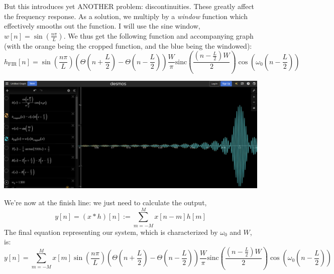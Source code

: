 \documentclass[a4paper]{article}
\begin{document}
But this introduces yet ANOTHER problem: discontinuities. These greatly affect the frequency response. As a solution, we multiply by a \textit{window} function which effectively smooths out the function. I will use the sine window, $w[n] = \sin(\frac{n\pi}{L})$. We thus get the following function and accompanying graph (with the orange being the cropped function, and the blue being the windowed):
$$h_\text{FIR}[n] = \sin(\frac{n\pi}{L})(\Theta(n + \frac{L}{2}) - \Theta(n - \frac{L}{2})) \frac{W}{\pi} \text{sinc}(\frac{(n-\frac{L}{2})W}{2})\cos(\omega_0 (n-\frac{L}{2}))$$
\begin{center}
\includegraphics[scale=0.3]{windowed_sinc.png} 
\end{center}
We're now at the finish line: we just need to calculate the output,
$$y[n] = (x * h)[n] := \sum_{m = -M}^M x[n-m]h[m]$$
The final equation representing our system, which is characterized by $\omega_0$ and $W$, is:
$$\boxed{y[n] = \sum_{m = -M}^M x[m]\sin(\frac{n\pi}{L})(\Theta(n + \frac{L}{2}) - \Theta(n - \frac{L}{2})) \frac{W}{\pi} \text{sinc}(\frac{(n-\frac{L}{2})W}{2})\cos(\omega_0 (n-\frac{L}{2}))}$$
\end{document}
